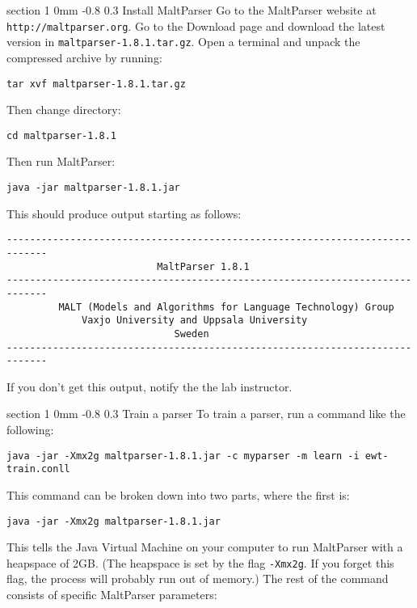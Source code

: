 \documentclass[11pt]{article}
\makeatletter
\newcommand{\newsec}[2]{\section{#1}\label{sec:#2}\noindent}
\renewcommand{\section}{\@startsection
{section}%
{1}%
{0mm}%
{-0.8\baselineskip}%
{0.3\baselineskip}%
{\bfseries\large}}%
\makeatother
\begin{document}
\newsec{Install MaltParser}{malt}%
Go to the MaltParser website at {\tt http://maltparser.org}. Go to the Download page and download the latest version in {\tt maltparser-1.8.1.tar.gz}. Open a terminal and unpack the compressed archive by running:
\begin{small}
\begin{verbatim}
tar xvf maltparser-1.8.1.tar.gz
\end{verbatim}
\end{small}
Then change directory:
\begin{small}
\begin{verbatim}
cd maltparser-1.8.1
\end{verbatim}
\end{small}
Then run MaltParser:
\begin{small}
\begin{verbatim}
java -jar maltparser-1.8.1.jar
\end{verbatim}
\end{small}
This should produce output starting as follows:
\begin{small}
\begin{verbatim}
-----------------------------------------------------------------------------
                          MaltParser 1.8.1                             
-----------------------------------------------------------------------------
         MALT (Models and Algorithms for Language Technology) Group          
             Vaxjo University and Uppsala University                         
                             Sweden                                          
-----------------------------------------------------------------------------
\end{verbatim}
\end{small}
If you don't get this output, notify the the lab instructor.

\newsec{Train a parser}{train}%
To train a parser, run a command like the following:
\begin{small}
\begin{verbatim}
java -jar -Xmx2g maltparser-1.8.1.jar -c myparser -m learn -i ewt-train.conll 
\end{verbatim}
\end{small}
This command can be broken down into two parts, where the first is:
\begin{small}
\begin{verbatim}
java -jar -Xmx2g maltparser-1.8.1.jar
\end{verbatim}
\end{small}
This tells the Java Virtual Machine on your computer to run MaltParser with a heapspace of 2GB. (The heapspace is set by the flag {\tt -Xmx2g}. If you forget this flag, the process will probably run out of memory.)
The rest of the command consists of specific MaltParser parameters:
\end{document}
